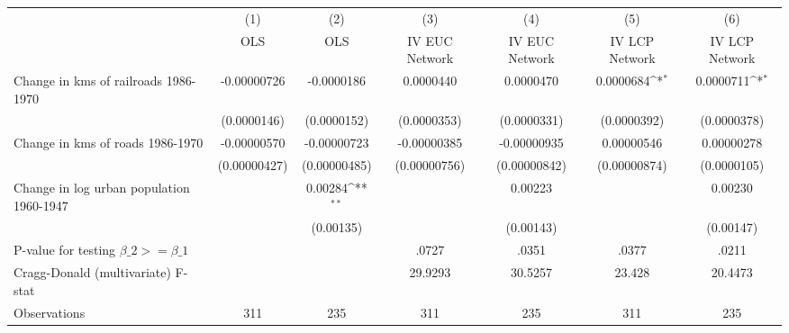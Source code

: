 {
\def\sym#1{\ifmmode^{#1}\else\(^{#1}\)\fi}
\begin{tabular}{l*{6}{c}}
\hline\hline
                &\multicolumn{1}{c}{(1)}&\multicolumn{1}{c}{(2)}&\multicolumn{1}{c}{(3)}&\multicolumn{1}{c}{(4)}&\multicolumn{1}{c}{(5)}&\multicolumn{1}{c}{(6)}\\
                &\multicolumn{1}{c}{OLS}&\multicolumn{1}{c}{OLS}&\multicolumn{1}{c}{IV EUC Network}&\multicolumn{1}{c}{IV EUC Network}&\multicolumn{1}{c}{IV LCP Network}&\multicolumn{1}{c}{IV LCP Network}\\
\hline
Change in kms of railroads 1986-1970&-0.00000726         &-0.0000186         &0.0000440         &0.0000470         &0.0000684\sym{*}  &0.0000711\sym{*}  \\
                &(0.0000146)         &(0.0000152)         &(0.0000353)         &(0.0000331)         &(0.0000392)         &(0.0000378)         \\
[1em]
Change in kms of roads 1986-1970&-0.00000570         &-0.00000723         &-0.00000385         &-0.00000935         &0.00000546         &0.00000278         \\
                &(0.00000427)         &(0.00000485)         &(0.00000756)         &(0.00000842)         &(0.00000874)         &(0.0000105)         \\
[1em]
Change in log urban population 1960-1947&                  &  0.00284\sym{**} &                  &  0.00223         &                  &  0.00230         \\
                &                  &(0.00135)         &                  &(0.00143)         &                  &(0.00147)         \\
\hline
P-value for testing $\beta\_{2} >= \beta\_{1}$&                  &                  &    .0727         &    .0351         &    .0377         &    .0211         \\
Cragg-Donald (multivariate) F-stat&                  &                  &  29.9293         &  30.5257         &   23.428         &  20.4473         \\
Observations    &      311         &      235         &      311         &      235         &      311         &      235         \\
\hline\hline
\end{tabular}
}
